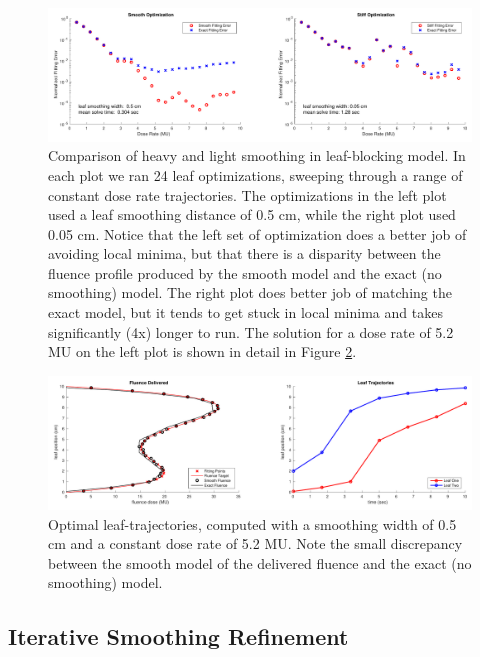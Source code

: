 \documentclass[12pt]{article}
\begin{document}
\begin{figure}
  \centering
  \includegraphics[width=\textwidth]{fig/smoothVsStiffOptimization.pdf}
  \caption{Comparison of heavy and light smoothing in leaf-blocking model.
           In each plot we ran 24 leaf optimizations, sweeping through a range of constant dose rate trajectories.
           The optimizations in the left plot used a leaf smoothing distance of 0.5 cm, while the
           right plot used 0.05 cm.
           Notice that the left set of optimization does a better job of avoiding local minima,
           but that there is a disparity between the fluence profile produced by the smooth model
           and the exact (no smoothing) model.
           The right plot does better job of matching the exact model, but it tends to get stuck in local minima
           and takes significantly (4x) longer to run.
           The solution for a dose rate of 5.2 MU on the left plot is
           shown in detail in Figure \ref{fig:fluenceMapSmoothingExample}.
          }
  \label{fig:smoothVsStiffOptimization}
\end{figure}

\begin{figure}
  \centering
  \includegraphics[width=\textwidth]{fig/fluenceMapSmoothingExample.pdf}
  \caption{ Optimal leaf-trajectories, computed with a smoothing width of 0.5 cm and a constant
            dose rate of 5.2 MU. Note the small discrepancy between the smooth model of the
            delivered fluence and the exact (no smoothing) model.}
  \label{fig:fluenceMapSmoothingExample}
\end{figure}


\subsection{Iterative Smoothing Refinement}
\end{document}
